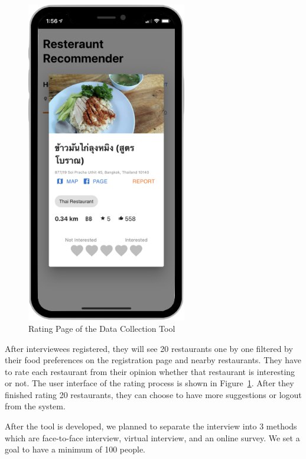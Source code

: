 \documentclass[12pt,oneside,openright,a4paper]{cpe-english-project}
\begin{document}
\newpage
\begin{figure}[H]\centering
\includegraphics[height=400pt]{./images/4RatingPageoftheDataCollectionTool.png}
\caption{Rating Page of the Data Collection Tool}\label{fig:4RatingPageoftheDataCollectionTool}
\end{figure}

After interviewees registered, they will see 20 restaurants one by one filtered by their food preferences on the registration page and nearby restaurants. They have to rate each restaurant from their opinion whether that restaurant is interesting or not. The user interface of the rating process is shown in Figure~\ref{fig:4RatingPageoftheDataCollectionTool}. After they finished rating 20 restaurants, they can choose to have more suggestions or logout from the system.

After the tool is developed, we planned to separate the interview into 3 methods which are face-to-face interview, virtual interview, and an online survey. We set a goal to have a minimum of 100 people.
\end{document}
